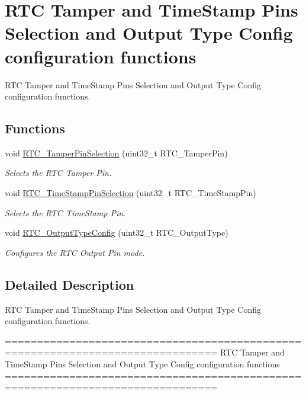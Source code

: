 \hypertarget{group___r_t_c___group11}{\section{R\-T\-C Tamper and Time\-Stamp Pins Selection and Output Type Config configuration functions}
\label{group___r_t_c___group11}
}


R\-T\-C Tamper and Time\-Stamp Pins Selection and Output Type Config configuration functions.  


\subsection*{Functions}
\begin{DoxyCompactItemize}
\item 
void \hyperlink{group___r_t_c___group11_ga46777272ae77eb9dc38610481e12b0ed}{R\-T\-C\-\_\-\-Tamper\-Pin\-Selection} (uint32\-\_\-t R\-T\-C\-\_\-\-Tamper\-Pin)
\begin{DoxyCompactList}\small\item\em Selects the R\-T\-C Tamper Pin. \end{DoxyCompactList}\item 
void \hyperlink{group___r_t_c___group11_gaedf9830bdaaaa50ea5d45d2ff7bb43a9}{R\-T\-C\-\_\-\-Time\-Stamp\-Pin\-Selection} (uint32\-\_\-t R\-T\-C\-\_\-\-Time\-Stamp\-Pin)
\begin{DoxyCompactList}\small\item\em Selects the R\-T\-C Time\-Stamp Pin. \end{DoxyCompactList}\item 
void \hyperlink{group___r_t_c___group11_ga95263b7acf7168d52f66ef9121f14760}{R\-T\-C\-\_\-\-Output\-Type\-Config} (uint32\-\_\-t R\-T\-C\-\_\-\-Output\-Type)
\begin{DoxyCompactList}\small\item\em Configures the R\-T\-C Output Pin mode. \end{DoxyCompactList}\end{DoxyCompactItemize}


\subsection{Detailed Description}
R\-T\-C Tamper and Time\-Stamp Pins Selection and Output Type Config configuration functions. \begin{DoxyVerb} ===============================================================================
  RTC Tamper and TimeStamp Pins Selection and Output Type Config configuration 
  functions 
 ===============================================================================  \end{DoxyVerb}
 


